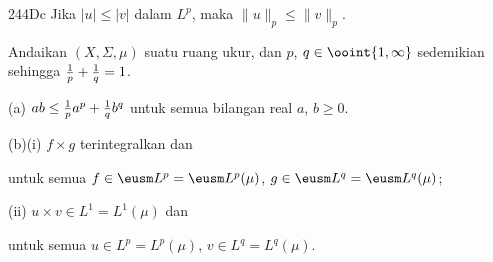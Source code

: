 \spheader 244Dc Jika $|u|\le |v|$ dalam $L^p$, maka
$\|u\|_p\le\|v\|_p$.

 Andaikan $(X,\Sigma,\mu)$ suatu ruang ukur, dan
$p$, $q\in\ooint{1,\infty}$ sedemikian sehingga
${1\over p}+{1\over q}=1$.

(a) $ab\le{1\over p}a^p+{1\over q}b^q$ untuk semua bilangan real
$a$, $b\ge 0$.

(b)(i) $f\times g$ terintegralkan dan


\noindent untuk semua $f\in \eusm L^p=\eusm L^p(\mu)$,
$g\in\eusm L^q=\eusm L^q(\mu)$;

\quad(ii) $u\times v\in L^1=L^1(\mu)$ dan


\noindent untuk semua $u\in L^p=L^p(\mu)$,
$v\in L^q=L^q(\mu)$.


